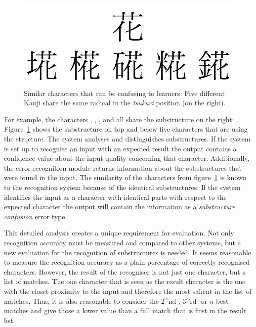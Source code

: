 \begin{figure}[htbp]
  \begin{center}
    \includegraphics[scale=0.4]{images/simlarCharaters.png}
    \caption{Similar characters that can be confusing to learners: Five different Kanji share the same radical in the \emph{tsukuri} position (on the right).}
    \label{fig:similarcharactersforuserconfusion}
  \end{center}
\end{figure}

For example, the characters 
, , ,  and  all share the substructure
on the right: .
Figure~\ref{fig:similarcharactersforuserconfusion} shows the
substructure on top and below five characters that are using the structure.
The system analyses and distinguishes substructures. If the system is set
up to recognise an input with an expected result the output contains
a confidence value about the input quality concerning that character.
Additionally, the error recognition module returns information about the
substructures that were found in the input.
The similarity of the characters from 
figure~\ref{fig:similarcharactersforuserconfusion} is known to
the recognition system because of the identical substructures.
If the system identifies the input as a character with identical parts
with respect to the expected character the output will contain the information
as a \emph{substructure confusion} error type.

This detailed analysis creates a unique requirement for evaluation. Not only
recognition accuracy must be measured and compared to other systems,
but a new evaluation for the recognition of substructures is needed.
It seems reasonable to measure the recognition accuracy as a plain
percentage of correctly recognised characters.
However, the result of the recogniser is not just one character,
but a list of matches. The one character that is seen as the result character
is the one with the closet proximity to the input and therefore the most salient
in the list of matches. Thus, it is also reasonable to consider the 2^{nd}-, 3^{rd}- or \(n\)-best
matches and give those a lower value than a full match that is first in the
result list.

